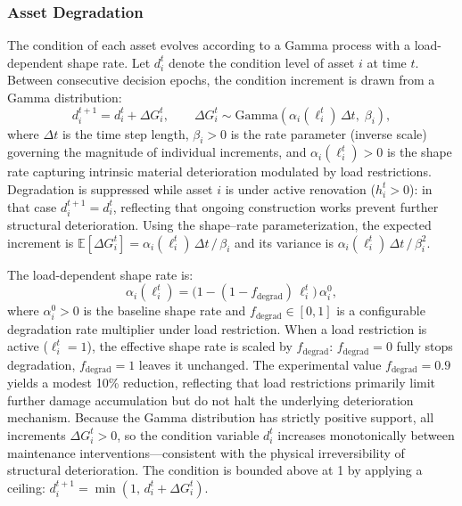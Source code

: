 \documentclass[3p, twocolumn]{elsarticle}
\begin{document}
\subsubsection{Asset Degradation}

The condition of each asset evolves according to a Gamma process with a load-dependent shape rate. Let $d_i^t$ denote the condition level of asset $i$ at time $t$. Between consecutive decision epochs, the condition increment is drawn from a Gamma distribution:
\begin{equation}
    d_i^{t+1} = d_i^t + \Delta G_i^t, \qquad \Delta G_i^t \sim \mathrm{Gamma}\!\left(\alpha_i(\ell_i^t)\,\Delta t,\; \beta_i\right),
    \label{eq:degradation}
\end{equation}
where $\Delta t$ is the time step length, $\beta_i > 0$ is the rate parameter (inverse scale) governing the magnitude of individual increments, and $\alpha_i(\ell_i^t) > 0$ is the shape rate capturing intrinsic material deterioration modulated by load restrictions. Degradation is suppressed while asset $i$ is under active renovation ($h_i^t > 0$): in that case $d_i^{t+1} = d_i^t$, reflecting that ongoing construction works prevent further structural deterioration. Using the shape--rate parameterization, the expected increment is $\mathbb{E}[\Delta G_i^t] = \alpha_i(\ell_i^t)\,\Delta t \,/\, \beta_i$ and its variance is $\alpha_i(\ell_i^t)\,\Delta t \,/\, \beta_i^2$.

The load-dependent shape rate is:
\begin{equation}
    \alpha_i(\ell_i^t) = \big(1 - (1 - f_{\text{degrad}})\,\ell_i^t\big)\,\alpha_i^0,
    \label{eq:shape_rate}
\end{equation}
where $\alpha_i^0 > 0$ is the baseline shape rate and $f_{\text{degrad}} \in [0,1]$ is a configurable degradation rate multiplier under load restriction. When a load restriction is active ($\ell_i^t = 1$), the effective shape rate is scaled by $f_{\text{degrad}}$: $f_{\text{degrad}} = 0$ fully stops degradation, $f_{\text{degrad}} = 1$ leaves it unchanged. The experimental value $f_{\text{degrad}} = 0.9$ yields a modest 10\% reduction, reflecting that load restrictions primarily limit further damage accumulation but do not halt the underlying deterioration mechanism. Because the Gamma distribution has strictly positive support, all increments $\Delta G_i^t > 0$, so the condition variable $d_i^t$ increases monotonically between maintenance interventions---consistent with the physical irreversibility of structural deterioration. The condition is bounded above at 1 by applying a ceiling: $d_i^{t+1} = \min(1,\, d_i^t + \Delta G_i^t)$.
\end{document}
